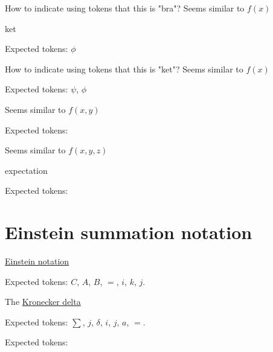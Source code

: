 \documentclass{article}
\begin{document}
How to indicate using tokens that this is "bra"? Seems similar to $f(x)$

\hrulefill


ket

Expected tokens: $\phi$

How to indicate using tokens that this is "ket"? Seems similar to $f(x)$

\hrulefill



Expected tokens: $\psi$, $\phi$

Seems similar to $f(x, y)$

\hrulefill



Expected tokens: 

Seems similar to $f(x, y, z)$

\hrulefill


expectation

Expected tokens: 

\hrulefill


\section{Einstein summation notation}


\href{https://en.wikipedia.org/wiki/Einstein_notation}{Einstein notation}


Expected tokens: $C$, $A$, $B$, $=$, $i$, $k$, $j$.

\hrulefill


The \href{https://en.wikipedia.org/wiki/Kronecker_delta}{Kronecker delta}

Expected tokens: $\sum$, $j$, $\delta$, $i$, $j$, $a$, $=$.

\hrulefill




Expected tokens: 

\hrulefill
\end{document}
